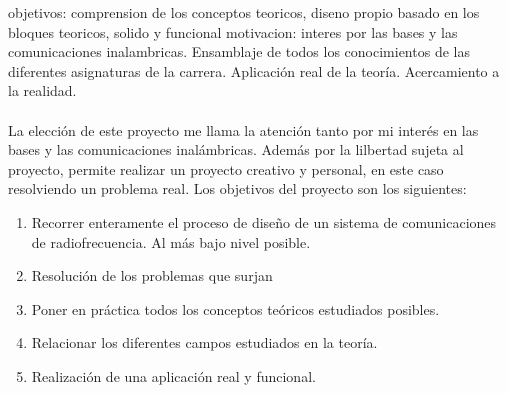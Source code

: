 objetivos: comprension de los conceptos teoricos, diseno propio basado en los bloques teoricos, solido y funcional 
motivacion: interes por las bases y las comunicaciones inalambricas.
Ensamblaje de todos los conocimientos de las diferentes asignaturas de la carrera.
Aplicación real de la teoría. Acercamiento a la realidad.

\paragraph{}
La elección de este proyecto me llama la atención tanto por mi interés en las bases y las comunicaciones inalámbricas. 
Además por la lilbertad sujeta al proyecto, permite realizar un proyecto creativo y personal, en este caso resolviendo un problema real.
Los objetivos del proyecto son los siguientes:
\begin{enumerate}
\item Recorrer enteramente el proceso de diseño de un sistema de comunicaciones de radiofrecuencia. Al más bajo nivel posible.
\item Resolución de los problemas que surjan
\item Poner en práctica todos los conceptos teóricos estudiados posibles.
\item Relacionar los diferentes campos estudiados en la teoría.
\item Realización de una aplicaci\'on real y funcional.
\end{enumerate}
